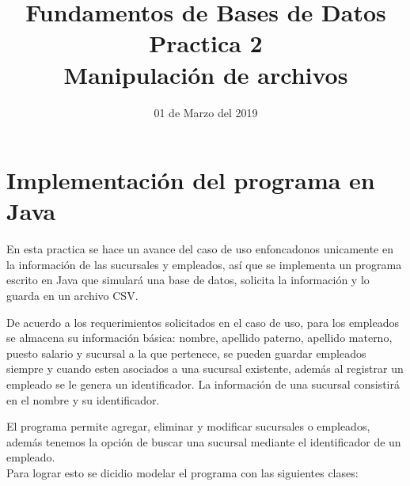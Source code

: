 \documentclass[10pt]{article}
\begin{document}
    \title{Fundamentos de Bases de Datos \\
        Practica 2\\ Manipulación de archivos
        } 
    \author{}
    \date{01 de Marzo del 2019}
    \maketitle
    
    \section{Implementación del programa en Java}\vspace{0.5cm}
    En esta practica se hace un avance del caso de uso enfoncadonos unicamente en la información de las sucursales y empleados, así que se implementa  un programa escrito en Java que simulará una base de datos, solicita la información y lo guarda en un archivo CSV.
    
    De acuerdo a los requerimientos solicitados en el caso de uso, para los empleados se almacena su información básica: nombre, apellido paterno, apellido materno, puesto salario y sucursal a la que pertenece, se pueden guardar empleados siempre y cuando esten asociados a una sucursal existente, además al registrar un empleado se le genera  un identificador. La información de una sucursal consistirá en el nombre y su identificador.
    
    El programa permite agregar, eliminar y modificar sucursales o empleados, además tenemos
    la opción de buscar una sucursal mediante el identificador de un empleado.\\
    
    
    Para lograr esto se dicidio modelar el programa con las siguientes clases:
    
\end{document}
